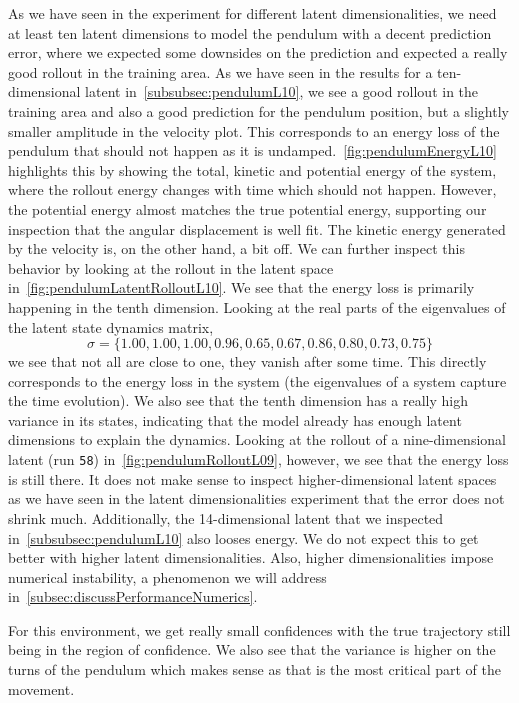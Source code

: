 		As we have seen in the experiment for different latent dimensionalities, we need at least ten latent dimensions to model the pendulum with a decent prediction error, where we expected some downsides on the prediction and expected a really good rollout in the training area. As we have seen in the results for a ten-dimensional latent in~\autoref{subsubsec:pendulumL10}, we see a good rollout in the training area and also a good prediction for the pendulum position, but a slightly smaller amplitude in the velocity plot. This corresponds to an energy loss of the pendulum that should not happen as it is undamped.~\autoref{fig:pendulumEnergyL10} highlights this by showing the total, kinetic and potential energy of the system, where the rollout energy changes with time which should not happen. However, the potential energy almost matches the true potential energy, supporting our inspection that the angular displacement is well fit. The kinetic energy generated by the velocity is, on the other hand, a bit off. We can further inspect this behavior by looking at the rollout in the latent space in~\autoref{fig:pendulumLatentRolloutL10}. We see that the energy loss is primarily happening in the tenth dimension. Looking at the real parts of the eigenvalues of the latent state dynamics matrix,
		\begin{equation*}
			\sigma = \{ 1.00, 1.00, 1.00, 0.96, 0.65, 0.67, 0.86, 0.80, 0.73, 0.75 \}
		\end{equation*}
		we see that not all are close to one, \ie they vanish after some time. This directly corresponds to the energy loss in the system (the eigenvalues of a system capture the time evolution). We also see that the tenth dimension has a really high variance in its states, indicating that the model already has enough latent dimensions to explain the dynamics. Looking at the rollout of a nine-dimensional latent (run \texttt{58}) in~\autoref{fig:pendulumRolloutL09}, however, we see that the energy loss is still there. It does not make sense to inspect higher-dimensional latent spaces as we have seen in the latent dimensionalities experiment that the error does not shrink much. Additionally, the 14-dimensional latent that we inspected in~\autoref{subsubsec:pendulumL10} also looses energy. We do not expect this to get better with higher latent dimensionalities. Also, higher dimensionalities impose numerical instability, a phenomenon we will address in~\autoref{subsec:discussPerformanceNumerics}.

		For this environment, we get really small confidences with the true trajectory still being in the region of confidence. We also see that the variance is higher on the turns of the pendulum which makes sense as that is the most critical part of the movement.

